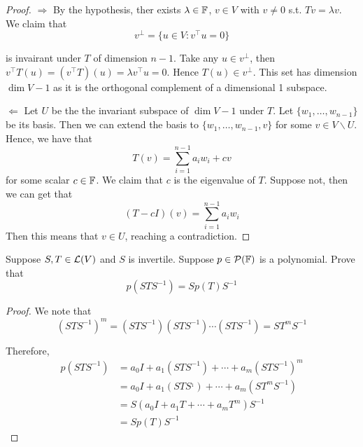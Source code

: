 \documentclass{extarticle}
\begin{document}
\begin{proof}


\(\Rightarrow\) By the hypothesis, ther exists \(\lambda \in \mathbb{F}\), \(v \in V\) with \(v \neq 0\) s.t. 
\(Tv = \lambda v\). We claim that 
\[v^\perp = \{u \in V \colon v^\top u = 0\}\]

is invairant under \(T\) of dimension \(n - 1\). Take any \(u \in v^\perp\), then 
\(v^\top T(u) = (v^\top T)(u) = \lambda v^\top u = 0\). Hence \(T(u) \in v^\perp\). This set has 
dimension \(\dim V - 1\) as it is the orthogonal complement of a dimensional 1 subspace. 

\(\Leftarrow\) Let \(U\) be the the invariant subspace of \(\dim V - 1\) under \(T\). Let 
\(\{w_1, \ldots, w_{n-1}\}\) be its basis. Then we can extend the basis to \(\{w_1, \ldots, w_{n-1}, v\}\)
for some \(v \in V \backslash U\). Hence, we have that 
\[T(v) = \sum_{i=1}^{n-1} a_i w_i + c v\]
for some scalar \(c \in \mathbb{F}\). We claim that \(c\) is the eigenvalue of \(T\). Suppose not, then we can get that 
\[(T - cI)(v) = \sum_{i=1}^{n-1} a_i w_i\]
Then this means that \(v \in U\), reaching a contradiction.

\end{proof}


\begin{problem}{40}
    Suppose \(S, T \in \mathcal{L}(V)\) and \(S\) is invertile. Suppose \(p \in \mathcal{P}(\mathbb{F})\) is a polynomial. Prove that 
    \[p(STS^{-1}) = S p(T)S^{-1}\]
\end{problem}

\begin{proof}
We note that 
\[(STS^{-1})^m = (STS^{-1})(STS^{-1}) \cdots (STS^{-1}) = ST^m S^{-1}\]

Therefore, 
\begin{align*}
    p(STS^{-1})
    &= a_0I + a_1(STS^{-1}) + \cdots + a_m(STS^{-1})^m \\ 
    &= a_0I + a_1(STS^{_1}) + \cdots + a_m(ST^mS^{-1}) \\ 
    &= S(a_0 I + a_1 T + \cdots + a_m T^m)S^{-1} \\ 
    &= Sp(T)S^{-1}
\end{align*}
\end{proof}
\end{document}
